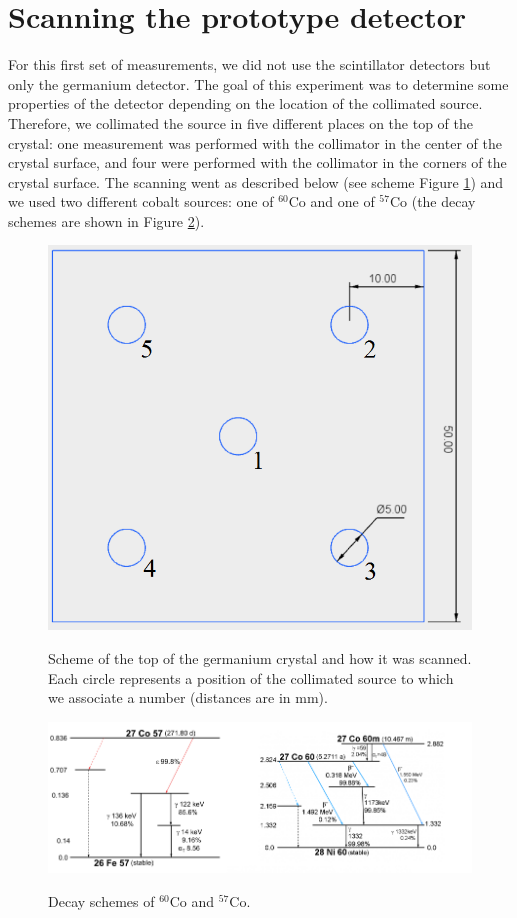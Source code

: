 \documentclass[11pt,a4paper]{article}
\begin{document}
\section{Scanning the prototype detector}

For this first set of measurements, we did not use the scintillator detectors but only the germanium detector. The goal of this experiment was to determine some properties of the detector depending on the location of the collimated source. Therefore, we collimated the source in five different places on the top of the crystal: one measurement was performed with the collimator in the center of the crystal surface, and four were performed with the collimator in the corners of the crystal surface. The scanning went as described below (see scheme Figure \ref{scan}) and we used two different cobalt sources: one of $^{60}$Co and one of $^{57}$Co (the decay schemes are shown in Figure \ref{decayCos}).

\begin{figure}[!h]
\centering
\includegraphics[scale=0.6]{scan.png}
\label{scan}
\caption{Scheme of the top of the germanium crystal and how it was scanned. Each circle represents a position of the collimated source to which we associate a number (distances are in mm).}
\end{figure}

\begin{figure}[!h]
\centering
\includegraphics[scale=0.9]{Cos_decays.png}
\label{decayCos}
\caption{Decay schemes of $^{60}$Co and $^{57}$Co.}
\end{figure}
\end{document}
